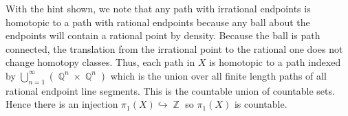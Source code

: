 \documentclass{article}
\DeclareMathOperator{\Z}{\mathbb{Z}}
\DeclareMathOperator{\Q}{\mathbb{Q}}
\DeclareMathOperator{\into}{\hookrightarrow}
\begin{document}
With the hint shown, we note that any path with irrational endpoints
is homotopic to a path with rational endpoints because any ball about
the endpoints will contain a rational point by density. Because the
ball is path connected, the translation from the irrational point to
the rational one does not change homotopy classes. Thus, each path in
$X$ is homotopic to a path indexed by $\bigcup_{n=1}^\infty (\Q^n
\times \Q^n)$ which is the union over all finite length paths of all
rational endpoint line segments. This is the countable union of
countable sets. Hence there is an injection $\pi_1(X) \into \Z$ so
$\pi_1(X)$ is countable.
\end{document}
